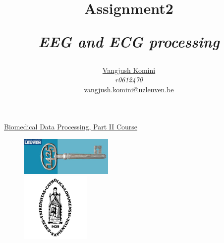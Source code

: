 \documentclass[a4paper]{article}
\title{Assignment2\\\centerline{\textit{EEG and ECG processing }} }
\author{
\href{mailto:vangjush.komini@uzleuven.be}{Vangjush Komini}\\  \textit{r0612470} \\
\href{mailto:vangjush.komini@uzleuven.be}{vangjush.komini@uzleuven.be}\\
}
\numberwithin{equation}{subsection}
\numberwithin{figure}{subsection}
\begin{document}
\maketitle
\begin{center}
\Large \href{https://onderwijsaanbod.kuleuven.be/syllabi/e/H06W1AE.htm#activetab=doelstellingen_idp41200}{Biomedical Data Processing, Part II Course}
\end{center}

\begin{figure}[!htbp]
\centering
\includegraphics[width=0.4\textwidth]{icon1.png}\\
\includegraphics[width=0.3\textwidth]{icon2.png}
\end{figure}












\clearpage



\clearpage
\appendix





\end{document}

